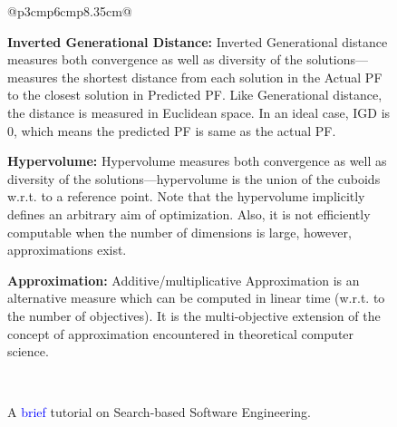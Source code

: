 \documentclass[sigconf,anonymous,review]{acmart}
\newcommand\llm[1]{\textcolor{blue}{#1\xspace}}
\begin{document}
\begin{figure}
{\begin{tabular}{@{}p{3cm}p{6cm}p{8.35cm}@{}}
{\begin{minipage}[b]{0.67\linewidth}
\noindent\textbf{Inverted Generational Distance: } Inverted Generational distance measures both convergence as well as diversity of the solutions---measures the shortest distance from each solution in the Actual PF to the closest solution in Predicted PF. Like Generational distance, the distance is measured in Euclidean space. In an ideal case, IGD is 0, which means the predicted PF is same as the actual PF.

\noindent\textbf{Hypervolume: } Hypervolume measures both convergence as well as diversity of the solutions---hypervolume is the union of the cuboids w.r.t. to a reference point. Note that the hypervolume implicitly defines an arbitrary aim of optimization. Also, it is not efficiently computable when the number of dimensions is large, however, approximations exist.

\noindent \textbf{Approximation: } Additive/multiplicative Approximation is an alternative measure which can be computed in linear time (w.r.t. to the number of objectives). It is the multi-objective extension of the concept of approximation encountered in theoretical computer science. 

\end{minipage}	
}\\
\end{tabular}}
\caption{A \llm{brief} tutorial on Search-based Software Engineering.}
\label{fig:sbse_crash}
\end{figure}
\end{document}
